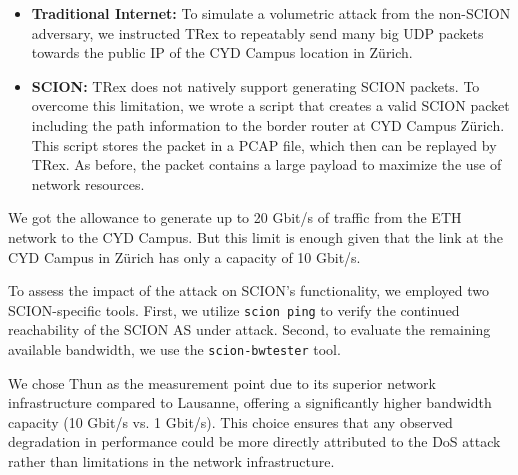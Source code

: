 \begin{itemize}
    \item \textbf{Traditional Internet:}
    To simulate a volumetric attack from the non-SCION adversary, we instructed TRex to repeatably send many big UDP packets towards the public IP of the CYD Campus location in Zürich.
    \item \textbf{SCION:} TRex does not natively support generating SCION packets.
    To overcome this limitation, we wrote a script that creates a valid SCION packet including the path information to the border router at CYD Campus Zürich.
    This script stores the packet in a PCAP file, which then can be replayed by TRex.
    As before, the packet contains a large payload to maximize the use of network resources.
\end{itemize}

We got the allowance to generate up to 20 Gbit/s of traffic from the ETH network to the CYD Campus.
But this limit is enough given that the link at the CYD Campus in Zürich has only a capacity of 10 Gbit/s.

To assess the impact of the attack on SCION's functionality, we employed two SCION-specific tools.
First, we utilize \texttt{scion ping} to verify the continued reachability of the SCION AS under attack.
Second, to evaluate the remaining available bandwidth, we use the \texttt{scion-bwtester} tool.

We chose Thun as the measurement point due to its superior network infrastructure compared to Lausanne, offering a significantly higher bandwidth capacity (10 Gbit/s vs. 1 Gbit/s).
This choice ensures that any observed degradation in performance could be more directly attributed to the DoS attack rather than limitations in the network infrastructure.